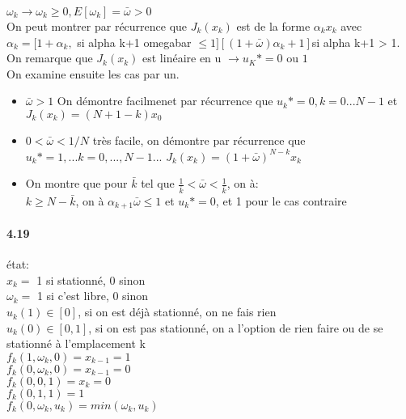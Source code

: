 \documentclass[oneside]{book}
\begin{document}
$\omega_k \rightarrow \omega_k \geq 0, E[\omega_k]=\bar{\omega}>0$\\

On peut montrer par récurrence que $J_k(x_k)$ est de la forme $\alpha_kx_k$ avec $\alpha_k = [1 + \alpha_k , $ si alpha k+1 omegabar $\leq 1][(1+\bar{\omega}) \alpha_k +1 ]$si alpha k+1 > 1.\\

On remarque que $J_k(x_k)$ est linéaire en u $\rightarrow u_K*=0$ ou $1$\\

On examine ensuite les cas par un.\\

\begin{itemize}
\item $\bar{\omega} > 1$ On démontre facilmenet par récurrence que $u_k*=0,k=0...N-1$ et $J_k(x_k) = (N+1-k)x_0$
\item $0 < \bar{\omega} < 1/N$ très facile, on démontre par récurrence que $u_k* = 1,...k=0,...,N-1$... $J_k(x_k) = (1+\bar{\omega})^{N-k}x_k$
\item On montre que pour $\bar{k}$ tel que $\frac{1}{\bar{k}}<\bar{\omega}<\frac{1}{\bar{k}}$, on à:\\

$k \geq N-\bar{k}$, on à $\alpha_{k+1}\bar{\omega} \leq 1$ et $u_k*=0$, et 1 pour le cas contraire
\end{itemize} 
\paragraph{4.19}
état:\\
$x_k = $ 1 si stationné, 0 sinon\\

$\omega_k =$ 1 si c'est libre, 0 sinon\\

$u_k(1) \in [0]$, si on est déjà stationné, on ne fais rien\\

$u_k(0) \in [0, 1]$, si on est pas stationné, on a l'option de rien faire ou de se stationné à l'emplacement k\\

$f_k(1,\omega_k, 0) = x_{k-1} = 1$\\
$f_k(0,\omega_k, 0) = x_{k-1} = 0$\\
$f_k(0,0, 1) = x_{k} = 0$\\
$f_k(0,1, 1) = 1$\\
$f_k(0,\omega_k,u_k) = min(\omega_k, u_k)$\\
\end{document}

